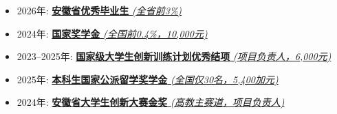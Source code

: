 
\begin{itemize}[left=0pt, itemsep=3pt]
    \item 2026年: \href{https://bean-young.github.io/document/anhui-outstanding-graduate.jpg}{\textbf{安徽省优秀毕业生} \emph{(全省前3\%)}}
    \item 2024年: \href{https://bean-young.github.io/document/1.pdf}{\textbf{国家奖学金} \emph{(全国前0.4\%，10,000元)}}
    \item 2023--2025年: \href{https://bean-young.github.io/document/12.pdf}{\textbf{国家级大学生创新训练计划优秀结项} \emph{(项目负责人，6,000元)}}
    \item 2025年: \href{https://bean-young.github.io/document/2.pdf}{\textbf{本科生国家公派留学奖学金} \emph{(全国仅30名，5,400加元)}}
    \item 2024年: \href{https://bean-young.github.io/document/3.pdf}{\textbf{安徽省大学生创新大赛金奖} \emph{(高教主赛道，项目负责人)}}
\end{itemize}
